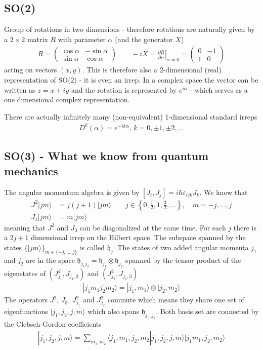 \documentclass[10pt,a4paper]{book}
\theoremstyle{definition}
\begin{document}
\subsection{SO(2)}
Group of rotations in two dimensions - therefore rotations are naturally given by a $2\times2$ matrix $R$ with parameter $\alpha$ (and the generator $X$)
\begin{align}
R=\left(\begin{matrix}
\cos\alpha  & -\sin\alpha\\
\sin\alpha & \cos\alpha
\end{matrix}\right)
\qquad
-iX=\left.\frac{\partial R}{\partial\alpha}\right|_{\alpha=0}=\left(\begin{matrix}
0 & -1\\
1 & 0
\end{matrix}\right)
\end{align}
acting on vectors $(x,y)$. This is therefore also a 2-dimensional (real) representation of SO(2) - it is even an irrep.
In a complex space the vector can be written as $z=x+iy$ and the rotation is represented by $e^{i\alpha}$ - which serves as a one dimensional complex representation.

There are actually infinitely many (non-equivalent) 1-dimensional standard irreps
\begin{align}
    D^{k}(\alpha)=e^{-ik\alpha},\,k=0,\pm1,\pm2,...
\end{align}

\subsection{SO(3) - What we know from quantum mechanics}
The angular momentum algebra is given by $[J_i,J_j]=i\hbar\varepsilon_{ijk}J_k$. We know that
\begin{align}
J^2|jm\rangle&=j(j+1)|jm\rangle\qquad j\in\left\{0,\frac{1}{2},1,\frac{3}{2},...\right\},\quad m=-j,...,j\\
J_z|jm\rangle&=m|jm\rangle
\end{align}
meaning that $J^2$ and $J_3$ can be diagonalized at the same time. For each $j$ there is a $2j+1$ dimensional 
irrep on the Hilbert space. The subspace spanned by the states $\{|jm\rangle\}_{m\in\{-j,...,j\}}$ 
is called $\mathfrak{h}_j$. The states of 
two added angular momenta $j_1$ and $j_2$ are in the space $\mathfrak{h}_{j_1j_2}=\mathfrak{h}_{j_1}\otimes\mathfrak{h}_{j_2}$ spanned by the tensor product of the eigenstates of $(J_{j_1}^2,J_{j_1,3})$ and $(J_{j_2}^2,J_{j_2,3})$
\begin{align}
|j_1m_1j_2m_2\rangle=|j_1,m_1\rangle\otimes|j_2,m_2\rangle
\end{align}
The operators $J^2$, $J_3$, $J_{j_1}^2$ and $J_{j_2}^2$ commute which means they share one set of eigenfunctions $|j_1,j_2,j,m\rangle$ which also spans $\mathfrak{h}_{j_1,j_2}$. Both basis set are connected by the Clebsch-Gordon coefficients
\begin{align}
|j_1,j_2,j,m\rangle=\sum_{m_1,m_2}\langle j_1,m_1,j_2,m_2|j_1,j_2,j,m\rangle|j_1m_1,j_2,m_2\rangle
\end{align}
\end{document}
